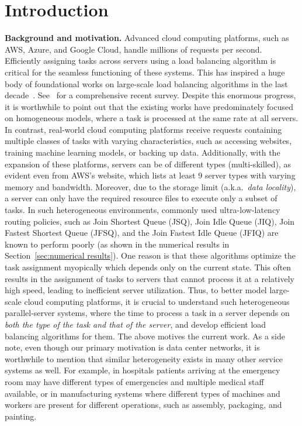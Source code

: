\documentclass[11pt, reqno]{article}
\numberwithin{equation}{section}
\numberwithin{theorem}{section}
\begin{document}
\section{Introduction}
\label{sec:intro}


\noindent
\textbf{Background and motivation.}
Advanced cloud computing platforms, such as AWS, Azure, and Google Cloud, handle millions of requests per second. Efficiently assigning tasks across servers using a load balancing algorithm is critical for the seamless functioning of these systems. 
This has inspired a huge body of foundational works on large-scale load balancing algorithms in the last decade~\cite{Mitzenmacher96,VDK96,Bramson11,LXKGLG11,EG18,GW19,WZS20,RM22}. See~\cite{BBLM21} for a comprehensive recent survey.
Despite this enormous progress, it is worthwhile to point out that the existing works have predominately focused on homogeneous models, where a task is processed at the same rate at all servers.
In contrast, real-world cloud computing platforms receive requests containing multiple classes of tasks with varying characteristics, such as accessing websites, training machine learning models, or backing up data. 
Additionally, with the expansion of these platforms, servers can be of different types (multi-skilled), as evident even from AWS's website, which lists at least 9 server types with varying memory and bandwidth. Moreover, due to the storage limit (a.k.a.~\textit{data locality}), a server can only have the required resource files to execute only a subset of tasks. 
In such heterogeneous environments, commonly used ultra-low-latency routing policies, such as Join Shortest Queue (JSQ), Join Idle Queue (JIQ), Join Fastest Shortest Queue (JFSQ), and the Join Fastest Idle Queue (JFIQ) are known to perform poorly (as shown in the numerical results in Section~\ref{sec:numerical results}). 
One reason is that these algorithms optimize the task assignment myopically which depends only on the current state.
This often results in the assignment of tasks to servers that cannot process it at a relatively high speed, leading to inefficient server utilization.
Thus, to better model large-scale cloud computing platforms, it is crucial to understand such heterogeneous parallel-server systems, where the time to process a task in a server depends on \textit{both the type of the task and that of the server}, and develop efficient load balancing algorithms for them. 
The above motives the current work.
As a side note, even though our primary motivation is data center networks, it is worthwhile to mention that similar heterogeneity exists in many other service systems as well. For example, in hospitals patients arriving at the emergency room may have different types of emergencies and multiple medical staff available, or in manufacturing systems where different types of machines and workers are present for different operations, such as assembly, packaging, and painting.\\
\end{document}
